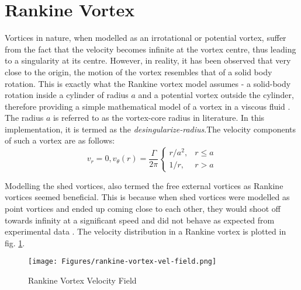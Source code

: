 \section{Rankine Vortex}
Vortices in nature, when modelled as an irrotational or potential vortex, suffer from the fact that the velocity becomes infinite at the vortex centre, thus leading to a singularity at its centre. However, in reality, it has been observed that very close to the origin, the motion of the vortex resembles that of a solid body rotation. This is exactly what the Rankine vortex model assumes - a solid-body rotation inside a cylinder of radius $a$ and a potential vortex outside the cylinder, therefore providing a simple mathematical model of a vortex in a viscous fluid \parencite{Acheson1990-cp}. The radius $a$ is referred to as the vortex-core radius in literature. In this implementation, it is termed as the \textit{desingularize-radius}.The velocity components of such a vortex are as follows:
\begin{equation}
	v_r=0, v_{\theta}(r)=\frac{\Gamma}{2\pi}\begin{cases}
			r/a^2, & r\leq a\\
            1/r, & r>a
		 \end{cases}
	\label{eq:rankine-velocity}
\end{equation}

Modelling the shed vortices, also termed the free external vortices as Rankine vortices seemed beneficial. This is because when shed vortices were modelled as point vortices and ended up coming close to each other, they would shoot off towards infinity at a significant speed and did not behave as expected from experimental data \parencite{Millikan2018-oc, Massey1998-zr}.
The velocity distribution in a Rankine vortex is plotted in fig. \ref{fig:rankine-vortex-vel-field}.

\begin{figure}[H]
	\centering
	\texttt{[image: Figures/rankine-vortex-vel-field.png]}
	\caption{Rankine Vortex Velocity Field}
	\label{fig:rankine-vortex-vel-field}
\end{figure}


